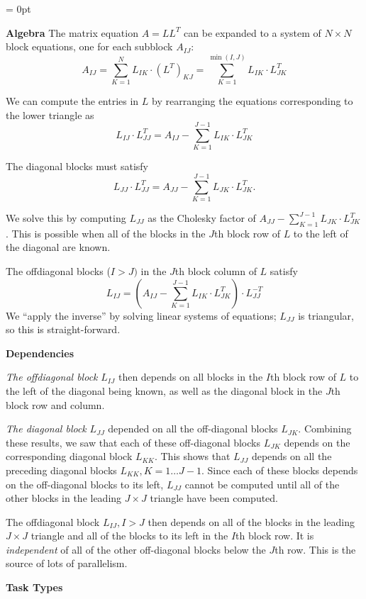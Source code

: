 \documentclass[12pt]{article}
\begin{document}
\parskip=12pt
\parindent = 0pt

{\large \bf Algebra}
The matrix equation $A = L L^T$ can be expanded to a system of $N \times N$
block equations, one for each subblock $A_{IJ}$:
\[  A_{IJ} = \sum_{K=1}^{N} L_{IK} \cdot (L^T)_{KJ} 
= \sum_{K=1}^{\min (I,J)} L_{IK} \cdot L_{JK}^T \]
  
We can compute the entries in $L$ by rearranging the equations corresponding to
the lower triangle as
\[ L_{IJ} \cdot L_{JJ}^T = A_{IJ} - 
\sum_{K=1}^{J-1} L_{IK} \cdot L_{JK}^T \]

The diagonal blocks must satisfy
\[ L_{JJ} \cdot L_{JJ}^T = A_{JJ} - 
\sum_{K=1}^{J-1} L_{JK} \cdot L_{JK}^T. \] 

We solve this by computing $L_{JJ}$ as the Cholesky factor of $A_{JJ} -
\sum_{K=1}^{J-1} L_{JK} \cdot L_{JK}^T$.  This is possible when all of the
blocks in the $J$th block row of $L$ to the left of the diagonal are known.

The offdiagonal blocks ($I > J)$ in the  $J$th block column of $L$ satisfy
\[ L_{IJ} = ( A_{IJ} - \sum_{K=1}^{J-1} L_{IK} \cdot L_{JK}^T) 
\cdot L_{JJ}^{-T}  \]
We ``apply the inverse'' by solving linear systems of equations; $L_{JJ}$ is
triangular, so this is straight-forward.  

{\large \bf Dependencies}

\emph{The offdiagonal block} $L_{IJ}$ then depends on all blocks in
the $I$th block row of $L$ to the left of the diagonal being known, as
well as the diagonal block in the $J$th block row and column.

\emph{The diagonal block} $L_{JJ}$ depended on all the off-diagonal
blocks $L_{JK}$.  Combining these results, we saw that each of these
off-diagonal blocks $L_{JK}$ depends on the corresponding diagonal
block $L_{KK}$.  This shows that $L_{JJ}$ depends on all the preceding
diagonal blocks $L_{KK}, K = 1 \ldots J-1$.  Since each of these
blocks depends on the off-diagonal blocks to its left, $L_{JJ}$ cannot
be computed until all of the other blocks in the leading $J \times J$
triangle have been computed.

The offdiagonal block $L_{IJ}, I > J$ then depends on all of the blocks in the
leading $J \times J$ triangle and all of the blocks to its left in the
$I$th block row.  It is \emph{independent} of all of the other off-diagonal
blocks below the $J$th row.  This is the source of lots of parallelism.

{\large \bf Task Types}
\end{document}
